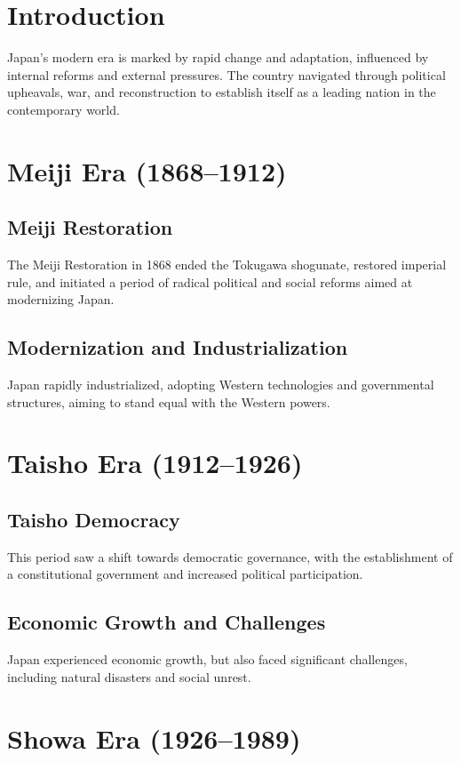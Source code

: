 \documentclass{book}
\begin{document}
\section{Introduction}
\label{sec:introduction-modern-japan}
Japan’s modern era is marked by rapid change and adaptation, influenced by internal reforms and external pressures. The country navigated through political upheavals, war, and reconstruction to establish itself as a leading nation in the contemporary world.

\section{Meiji Era (1868–1912)}
\label{sec:meiji-era}
\subsection{Meiji Restoration}
The Meiji Restoration in 1868 ended the Tokugawa shogunate, restored imperial rule, and initiated a period of radical political and social reforms aimed at modernizing Japan.

\subsection{Modernization and Industrialization}
Japan rapidly industrialized, adopting Western technologies and governmental structures, aiming to stand equal with the Western powers.

\section{Taisho Era (1912–1926)}
\label{sec:taisho-era}
\subsection{Taisho Democracy}
This period saw a shift towards democratic governance, with the establishment of a constitutional government and increased political participation.

\subsection{Economic Growth and Challenges}
Japan experienced economic growth, but also faced significant challenges, including natural disasters and social unrest.

\section{Showa Era (1926–1989)}
\label{sec:showa-era}
\end{document}
